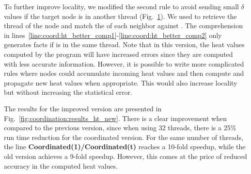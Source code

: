To further improve locality, we modified the second rule to avoid sending small
$\delta$ values if the target node is in another thread
(Fig.~\ref{code:coord:ht_better}). We used  to retrieve the
thread  of the node  and match the  of each
neighbor  against . The comprehension in
lines~\ref{line:coord:ht_better_comp1}-\ref{line:coord:ht_better_comp2} only
generates  facts if  is in the same thread. Note
that in this version, the heat values computed by the program will have
increased errors since they are computed with less accurate information.
However, it is possible to write more complicated rules where nodes could
accumulate incoming heat values and then compute and propagate new heat values
when appropriate. This would also increase locality but without increasing the
statistical error.

The results for the improved version are presented in
Fig.~\ref{fig:coordination:results_ht_new}. There is a clear improvement when
compared to the previous version, since when using 32 threads, there is a 25\%
run time reduction for the coordinated version. For the same number of threads,
the line \textbf{Coordinated(1)/Coordinated(t)} reaches a 10-fold speedup, while
the old version achieves a 9-fold speedup. However, this comes at the price of
reduced accuracy in the computed heat values.

\begin{figure}[h!]

  \label{code:coord:ht_better}
\end{figure}

